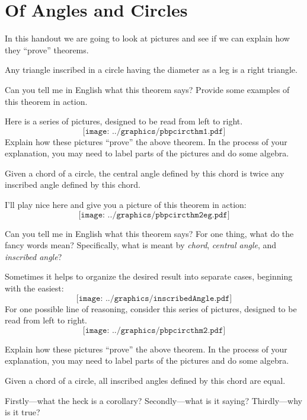 \newpage
\section{Of Angles and Circles} %

In this handout we are going to look at pictures and see if we can
explain how they ``prove'' theorems.


\begin{theorem} 
Any triangle inscribed in a circle having the diameter as a leg is a
right triangle.
\end{theorem}

\begin{prob}
Can you tell me in English what this theorem says? Provide some
examples of this theorem in action.
\end{prob}

\begin{prob} 
Here is a series of pictures, designed to be read from left to right.
\[
\texttt{[image: ../graphics/pbpcircthm1.pdf]}
\]
Explain how these pictures ``prove'' the above theorem. In the process
of your explanation, you may need to label parts of the pictures and
do some algebra.
\end{prob}


\begin{theorem} 
Given a chord of a circle, the central angle defined by this chord is
twice any inscribed angle defined by this chord.
\end{theorem}

I'll play nice here and give you a picture of this theorem in action:
\[
\texttt{[image: ../graphics/pbpcircthm2eg.pdf]}
\]

\begin{prob}
Can you tell me in English what this theorem says? For one thing, what
do the fancy words mean? Specifically, what is meant by
\textit{chord}, \textit{central angle}, and \textit{inscribed angle}?
\end{prob}

\begin{prob} 
Sometimes it helps to organize the desired result into separate cases, beginning with the easiest:  
$$\texttt{[image: ../graphics/inscribedAngle.pdf]}$$
For one possible line of reasoning, consider this series of pictures, designed to be read from left to right.
\[
\texttt{[image: ../graphics/pbpcircthm2.pdf]}
\]

Explain how these pictures ``prove'' the above theorem. In the process
of your explanation, you may need to label parts of the pictures and
do some algebra.
\end{prob}

\begin{corollary} 
Given a chord of a circle, all inscribed angles defined by this chord
are equal.
\end{corollary}

\begin{prob} 
Firstly---what the heck is a corollary? Secondly---what is it saying?
Thirdly---why is it true?
\end{prob}

